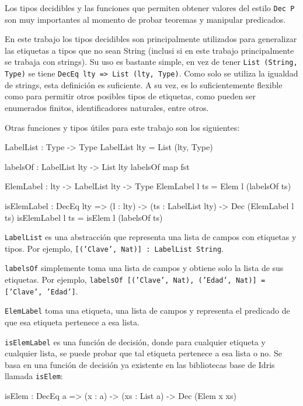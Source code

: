 Los tipos decidibles y las funciones que permiten obtener valores del estilo \texttt{Dec P} son muy importantes al momento de probar teoremas y manipular predicados.

En este trabajo los tipos decidibles son principalmente utilizados para generalizar las etiquetas a tipos que no sean String (inclusi si en este trabajo principalmente se trabaja con strings). Su uso es bastante simple, en vez de tener \texttt{List (String, Type)} se tiene \texttt{DecEq lty => List (lty, Type)}. Como solo se utiliza la igualdad de strings, esta definición es suficiente. A su vez, es lo suficientemente flexible como para permitir otros posibles tipos de etiquetas, como pueden ser enumerados finitos, identificadores naturales, entre otros.

Otras funciones y tipos útiles para este trabajo son los siguientes:

\begin{code}
LabelList : Type -> Type
LabelList lty = List (lty, Type)

labelsOf : LabelList lty -> List lty
labelsOf map fst

ElemLabel : lty -> LabelList lty -> Type
ElemLabel l ts = Elem l (labelsOf ts)

isElemLabel : DecEq lty => (l : lty) ->
  (ts : LabelList lty) ->
  Dec (ElemLabel l ts)
isElemLabel l ts = isElem l (labelsOf ts)
\end{code}

\texttt{LabelList} es una abstracción que representa una lista de campos con etiquetas y tipos. Por ejemplo, \texttt{[('Clave', Nat)] : LabelList String}.

\texttt{labelsOf} simplemente toma una lista de campos y obtiene solo la lista de sus etiquetas. Por ejemplo, \texttt{labelsOf [('Clave', Nat), ('Edad', Nat)] = ['Clave', 'Edad']}.

\texttt{ElemLabel} toma una etiqueta, una lista de campos y representa el predicado de que esa etiqueta pertenece a esa lista.

\texttt{isElemLabel} es una función de decisión, donde para cualquier etiqueta y cualquier lista, se puede probar que tal etiqueta pertenece a esa lista o no. Se basa en una función de decisión ya existente en las bibliotecas base de Idris llamada \texttt{isElem}:

\begin{code}
isElem : DecEq a => (x : a) -> (xs : List a) ->
  Dec (Elem x xs)
\end{code}

